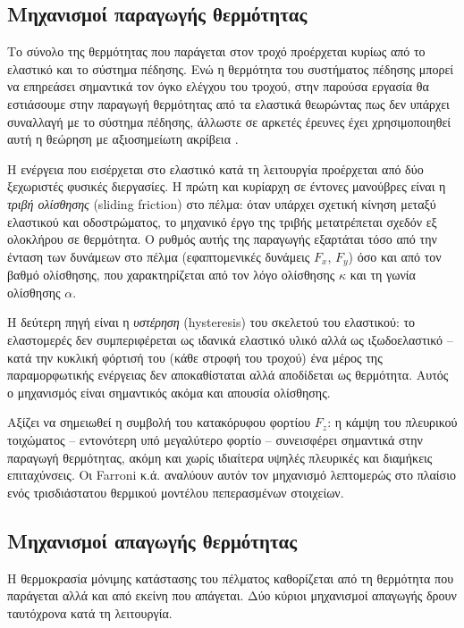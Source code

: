 \subsection{Μηχανισμοί παραγωγής θερμότητας}
\label{subsec:heat_gen}

Το σύνολο της θερμότητας που παράγεται στον τροχό προέρχεται κυρίως από το ελαστικό
και το σύστημα πέδησης. Ενώ η θερμότητα του συστήματος πέδησης μπορεί να επηρεάσει σημαντικά
τον όγκο ελέγχου του τροχού, στην παρούσα εργασία θα εστιάσουμε στην παραγωγή θερμότητας από
τα ελαστικά θεωρώντας πως δεν υπάρχει συναλλαγή με το σύστημα πέδησης, άλλωστε σε αρκετές
έρευνες έχει χρησιμοποιηθεί αυτή η θεώρηση με αξιοσημείωτη ακρίβεια \cite{West2022, Tremlett2016}.

Η ενέργεια που εισέρχεται στο ελαστικό κατά τη λειτουργία προέρχεται από δύο ξεχωριστές
φυσικές διεργασίες. Η πρώτη και κυρίαρχη σε έντονες μανούβρες είναι η \emph{τριβή
ολίσθησης} (sliding friction) στο πέλμα: όταν υπάρχει σχετική κίνηση μεταξύ
ελαστικού και οδοστρώματος, το μηχανικό έργο της τριβής μετατρέπεται σχεδόν εξ ολοκλήρου σε
θερμότητα. Ο ρυθμός αυτής της παραγωγής εξαρτάται τόσο από την ένταση των δυνάμεων στο
πέλμα (εφαπτομενικές δυνάμεις $F_x$, $F_y$) όσο και από τον βαθμό ολίσθησης, που
χαρακτηρίζεται από τον λόγο ολίσθησης $\kappa$ και τη γωνία ολίσθησης $\alpha$.

Η δεύτερη πηγή είναι η \emph{υστέρηση} (hysteresis) του σκελετού του ελαστικού: το ελαστομερές δεν
συμπεριφέρεται ως ιδανικά ελαστικό υλικό αλλά ως ιξωδοελαστικό -- κατά την κυκλική φόρτισή
του (κάθε στροφή του τροχού) ένα μέρος της παραμορφωτικής ενέργειας δεν αποκαθίσταται αλλά
αποδίδεται ως θερμότητα. Αυτός ο μηχανισμός είναι σημαντικός ακόμα και απουσία ολίσθησης.

Αξίζει να σημειωθεί η συμβολή του κατακόρυφου φορτίου $F_z$: η κάμψη του πλευρικού τοιχώματος
-- εντονότερη υπό μεγαλύτερο φορτίο -- συνεισφέρει σημαντικά στην παραγωγή θερμότητας, 
ακόμη και χωρίς ιδιαίτερα υψηλές πλευρικές και διαμήκεις επιταχύνσεις.
Οι Farroni κ.ά. \cite{Farroni2014TRT} αναλύουν αυτόν
τον μηχανισμό λεπτομερώς στο πλαίσιο ενός τρισδιάστατου θερμικού
μοντέλου πεπερασμένων στοιχείων.

\subsection{Μηχανισμοί απαγωγής θερμότητας}
\label{subsec:heat_diss}
Η θερμοκρασία μόνιμης κατάστασης του πέλματος καθορίζεται από τη θερμότητα που παράγεται
αλλά και από εκείνη που απάγεται. Δύο κύριοι μηχανισμοί απαγωγής δρουν ταυτόχρονα κατά τη
λειτουργία.

